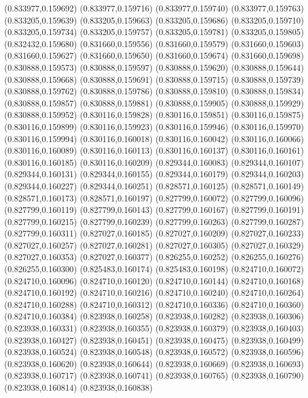 (0.833977,0.159692)
(0.833977,0.159716)
(0.833977,0.159740)
(0.833977,0.159763)
(0.833205,0.159639)
(0.833205,0.159663)
(0.833205,0.159686)
(0.833205,0.159710)
(0.833205,0.159734)
(0.833205,0.159757)
(0.833205,0.159781)
(0.833205,0.159805)
(0.832432,0.159680)
(0.831660,0.159556)
(0.831660,0.159579)
(0.831660,0.159603)
(0.831660,0.159627)
(0.831660,0.159650)
(0.831660,0.159674)
(0.831660,0.159698)
(0.830888,0.159573)
(0.830888,0.159597)
(0.830888,0.159620)
(0.830888,0.159644)
(0.830888,0.159668)
(0.830888,0.159691)
(0.830888,0.159715)
(0.830888,0.159739)
(0.830888,0.159762)
(0.830888,0.159786)
(0.830888,0.159810)
(0.830888,0.159834)
(0.830888,0.159857)
(0.830888,0.159881)
(0.830888,0.159905)
(0.830888,0.159929)
(0.830888,0.159952)
(0.830116,0.159828)
(0.830116,0.159851)
(0.830116,0.159875)
(0.830116,0.159899)
(0.830116,0.159923)
(0.830116,0.159946)
(0.830116,0.159970)
(0.830116,0.159994)
(0.830116,0.160018)
(0.830116,0.160042)
(0.830116,0.160066)
(0.830116,0.160089)
(0.830116,0.160113)
(0.830116,0.160137)
(0.830116,0.160161)
(0.830116,0.160185)
(0.830116,0.160209)
(0.829344,0.160083)
(0.829344,0.160107)
(0.829344,0.160131)
(0.829344,0.160155)
(0.829344,0.160179)
(0.829344,0.160203)
(0.829344,0.160227)
(0.829344,0.160251)
(0.828571,0.160125)
(0.828571,0.160149)
(0.828571,0.160173)
(0.828571,0.160197)
(0.827799,0.160072)
(0.827799,0.160096)
(0.827799,0.160119)
(0.827799,0.160143)
(0.827799,0.160167)
(0.827799,0.160191)
(0.827799,0.160215)
(0.827799,0.160239)
(0.827799,0.160263)
(0.827799,0.160287)
(0.827799,0.160311)
(0.827027,0.160185)
(0.827027,0.160209)
(0.827027,0.160233)
(0.827027,0.160257)
(0.827027,0.160281)
(0.827027,0.160305)
(0.827027,0.160329)
(0.827027,0.160353)
(0.827027,0.160377)
(0.826255,0.160252)
(0.826255,0.160276)
(0.826255,0.160300)
(0.825483,0.160174)
(0.825483,0.160198)
(0.824710,0.160072)
(0.824710,0.160096)
(0.824710,0.160120)
(0.824710,0.160144)
(0.824710,0.160168)
(0.824710,0.160192)
(0.824710,0.160216)
(0.824710,0.160240)
(0.824710,0.160264)
(0.824710,0.160288)
(0.824710,0.160312)
(0.824710,0.160336)
(0.824710,0.160360)
(0.824710,0.160384)
(0.823938,0.160258)
(0.823938,0.160282)
(0.823938,0.160306)
(0.823938,0.160331)
(0.823938,0.160355)
(0.823938,0.160379)
(0.823938,0.160403)
(0.823938,0.160427)
(0.823938,0.160451)
(0.823938,0.160475)
(0.823938,0.160499)
(0.823938,0.160524)
(0.823938,0.160548)
(0.823938,0.160572)
(0.823938,0.160596)
(0.823938,0.160620)
(0.823938,0.160644)
(0.823938,0.160669)
(0.823938,0.160693)
(0.823938,0.160717)
(0.823938,0.160741)
(0.823938,0.160765)
(0.823938,0.160790)
(0.823938,0.160814)
(0.823938,0.160838)
